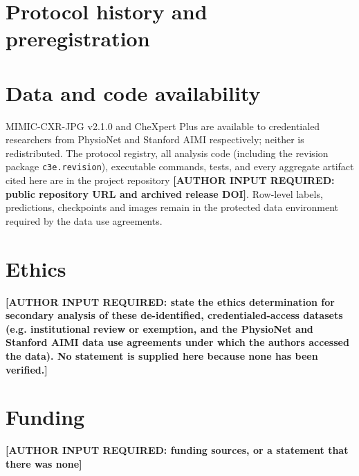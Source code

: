 \documentclass[11pt,a4paper]{article}
\newcommand{\authorinput}[1]{\textcolor{red!70!black}{\textbf{[AUTHOR INPUT REQUIRED: #1]}}}
\begin{document}
\begin{abstract}
\noindent\textbf{Conclusions.} When report-derived labels are available at
different rates in two hospitals, the sign of a cross-site selective-risk gap
depends on analysis choices that this protocol did not fix.
Cross-site claims require a reference standard that is dense and comparable at
both sites. Within-site context effects were more stable, at least at the
source site, but were not fully robust to the training seed.
\end{abstract}







\section*{Protocol history and preregistration}


\section*{Data and code availability}
MIMIC-CXR-JPG v2.1.0 and CheXpert Plus are available to credentialed
researchers from PhysioNet and Stanford AIMI respectively; neither is
redistributed. The protocol registry, all analysis code (including the
revision package \texttt{c3e.revision}), executable commands, tests, and every
aggregate artifact cited here are in the project repository
\authorinput{public repository URL and archived release DOI}. Row-level labels,
predictions, checkpoints and images remain in the protected data environment
required by the data use agreements.

\section*{Ethics}
\authorinput{state the ethics determination for secondary analysis of these
de-identified, credentialed-access datasets (e.g. institutional review or
exemption, and the PhysioNet and Stanford AIMI data use agreements under which
the authors accessed the data). No statement is supplied here because none has
been verified.}

\section*{Funding}
\authorinput{funding sources, or a statement that there was none}
\end{document}
